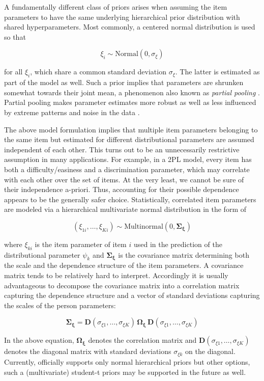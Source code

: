\documentclass[
]{jss}
\begin{document}
A fundamentally different class of priors arises when assuming the item
parameters to have the same underlying hierarchical prior distribution
with shared hyperparameters. Most commonly, a centered normal
distribution is used so that

\[
\xi_i \sim \text{Normal}(0, \sigma_\xi)
\]

for all \(\xi_i\), which share a common standard deviation
\(\sigma_\xi\). The latter is estimated as part of the model as well.
Such a prior implies that parameters are shrunken somewhat towards their
joint mean, a phenomenon also known as \emph{partial pooling}
\citep{gelmanMLM2006}. Partial pooling makes parameter estimates more
robust as well as less influenced by extreme patterns and noise in the
data \citep{gelmanMLM2006}.

The above model formulation implies that multiple item parameters
belonging to the same item but estimated for different distributional
parameters are assumed independent of each other. This turns out to be
an unnecessarily restrictive assumption in many applications. For
example, in a 2PL model, every item has both a difficulty/easiness and a
discrimination parameter, which may correlate with each other over the
set of items. At the very least, we cannot be sure of their independence
a-priori. Thus, accounting for their possible dependence appears to be
the generally safer choice. Statistically, correlated item parameters
are modeled via a hierarchical multivariate normal distribution in the
form of

\[
(\xi_{1i}, \ldots, \xi_{Ki}) \sim \text{Multinormal}(0, \mathbf{\Sigma_\xi})
\]

where \(\xi_{ki}\) is the item parameter of item \(i\) used in the
prediction of the distributional parameter \(\psi_k\) and
\(\mathbf{\Sigma_\xi}\) is the covariance matrix determining both the
scale and the dependence structure of the item parameters. A covariance
matrix tends to be relatively hard to interpret. Accordingly it is
usually advantageous to decompose the covariance matrix into a
correlation matrix capturing the dependence structure and a vector of
standard deviations capturing the scales of the person parameters:

\[
\mathbf{\Sigma_\xi} = \mathbf{D}(\sigma_{\xi 1}, \ldots, \sigma_{\xi K}) \, \mathbf{\Omega_\xi} \, \mathbf{D}(\sigma_{\xi 1}, \ldots, \sigma_{\xi K})
\]

In the above equation, \(\mathbf{\Omega_\xi}\) denotes the correlation
matrix and \(\mathbf{D}(\sigma_{\xi 1}, \ldots, \sigma_{\xi K})\)
denotes the diagonal matrix with standard deviations \(\sigma_{\xi k}\)
on the diagonal. Currently,  officially supports only normal
hierarchical priors but other options, such a (multivariate) student-t
priors may be supported in the future as well.
\end{document}
